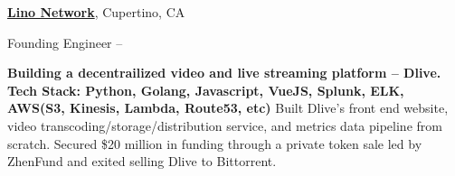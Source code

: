 \documentclass[a4paper,MMMyyyy,nonstopmode]{simpleresumecv}
\begin{document}
\begin{Body}
\BigGap
\Entry
\href{https://lino.network/}
{\textbf{Lino Network}},
Cupertino, CA

\Gap
\BulletItem
Founding Engineer
\hfill
{} --

\begin{Detail}
\SubBulletItem \textbf{Building a decentrailized video and live streaming platform -- Dlive.}
\SubBulletItem \textbf{Tech Stack: Python, Golang, Javascript, VueJS, Splunk, ELK, AWS(S3, Kinesis, Lambda, Route53, etc)}
\SubBulletItem 
Built Dlive's front end website, video transcoding/storage/distribution service, and metrics data pipeline from scratch.
\SubBulletItem
Secured \$20 million in funding through a private token sale led by ZhenFund and exited selling Dlive to Bittorrent.
\end{Detail}







\end{Body}
\end{document}
